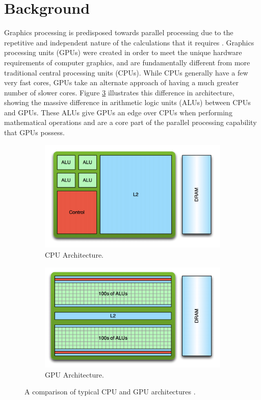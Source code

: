 \documentclass{article}
\begin{document}
\section{Background}
Graphics processing is predisposed towards parallel processing due to the repetitive and independent nature of the calculations that it requires \cite[p.~4]{sellers2016}. Graphics processing units (GPUs) were created in order to meet the unique hardware requirements of computer graphics, and are fundamentally different from more traditional central processing units (CPUs). While CPUs generally have a few very fast cores, GPUs take an alternate approach of having a much greater number of slower cores. Figure \ref{fig:architecture} illustrates this difference in architecture, showing the massive difference in arithmetic logic units (ALUs) between CPUs and GPUs. These ALUs give GPUs an edge over CPUs when performing mathematical operations and are a core part of the parallel processing capability that GPUs possess.

\begin{figure}[h]
    \centering
    \begin{subfigure}[h]{0.39\textwidth}
    	\includegraphics[width=\textwidth]{cpu}
    	\caption{CPU Architecture.}
    	\label{fig:cpu}
    \end{subfigure}
    \begin{subfigure}[h]{0.39\textwidth}
	    \includegraphics[width=\textwidth]{gpu}
	    \caption{GPU Architecture.}
	    \label{fig:gpu}
    \end{subfigure}
	\caption{A comparison of typical CPU and GPU architectures \cite{larkin2016}.}
	\label{fig:architecture}
\end{figure}
\end{document}
